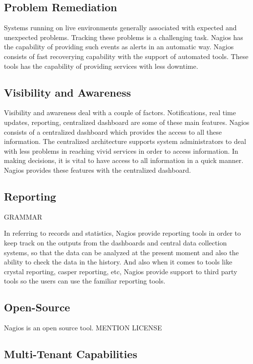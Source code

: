 \documentclass[9pt,twocolumn,twoside]{styles/osajnl}
\begin{document}
\subsection{Problem Remediation}

Systems running on live environments generally associated with
expected and unexpected problems. Tracking these problems is a
challenging task.  Nagios has the capability of providing such events
as alerts in an automatic way.  Nagios consists of fast recoverying
capability with the support of automated tools. These tools has the
capability of providing services with less downtime. 

\subsection{Visibility and Awareness}

Visibility and awareness deal with a couple of factors. Notifications,
real time updates, reporting, centralized dashboard are some of these
main features. Nagios consists of a centralized dashboard which
provides the access to all these information. The centralized
architecture supports system administrators to deal with less problems
in reaching vivid services in order to access information. In making
decisions, it is vital to have access to all information in a quick
manner.  Nagios provides these features with the centralized
dashboard.

\subsection{Reporting}

GRAMMAR

In referring to records and statistics, Nagios provide reporting tools
in order to keep track on the outputs from the dashboards and central
data collection systems, so that the data can be analyzed at the
present moment and also the ability to check the data in the history.
And also when it comes to tools like crystal reporting, casper
reporting, etc, Nagios provide support to third party tools so the
users can use the familiar reporting tools.

\subsection{Open-Source}

Nagios is an open source tool. MENTION LICENSE

\subsection{Multi-Tenant Capabilities}
\end{document}
